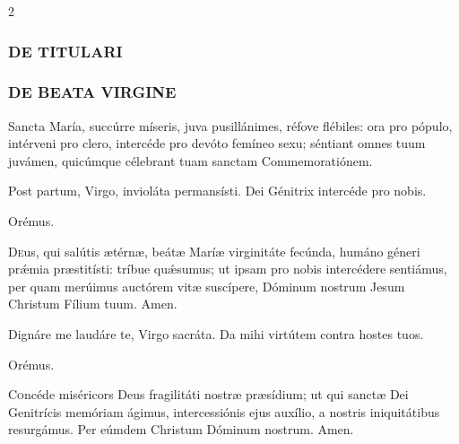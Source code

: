 \documentclass[9pt,twoside]{extarticle}
\begin{document}
\begin{multicols}{2}
\subsubsection*{\center \textsc{DE TITULARI}}
\begin{center}\end{center}

\subsubsection*{\center \textsc{DE BEATA VIRGINE}}
\begin{tightlist}{}
\item {}
\item {} Sancta María, succúrre míseris, juva pusillánimes, réfove flébiles: ora pro pópulo, intérveni pro clero, intercéde pro devóto femíneo sexu; séntiant omnes tuum juvámen, quicúmque célebrant tuam sanctam Commemoratiónem.
\item {}
\item {} Post partum, Virgo, invioláta permansísti.  Dei Génitrix intercéde pro nobis.
\item Orémus. \hfill {}
\end{tightlist}
\lettrine{D}eus, qui salútis ætérnæ, beátæ Maríæ virginitáte fecúnda, humáno géneri prǽmia præstitísti: tríbue quǽsumus; ut ipsam pro nobis intercédere sentiámus, per quam merúimus auctórem vitæ suscípere, Dóminum nostrum Jesum Christum Fílium tuum. Amen.

\begin{tightlist}{}
\item {}
\item {} Dignáre me laudáre te, Virgo sacráta.  Da mihi virtútem contra hostes tuos.
\item Orémus. \hfill {}
\end{tightlist}
\lettrine{C}oncéde miséricors Deus fragilitáti nostræ præsídium; ut qui sanctæ Dei Genitrícis memóriam ágimus, intercessiónis ejus auxílio, a nostris iniquitátibus resurgámus. Per eúmdem Christum Dóminum nostrum. Amen.


\end{multicols}
\end{document}
